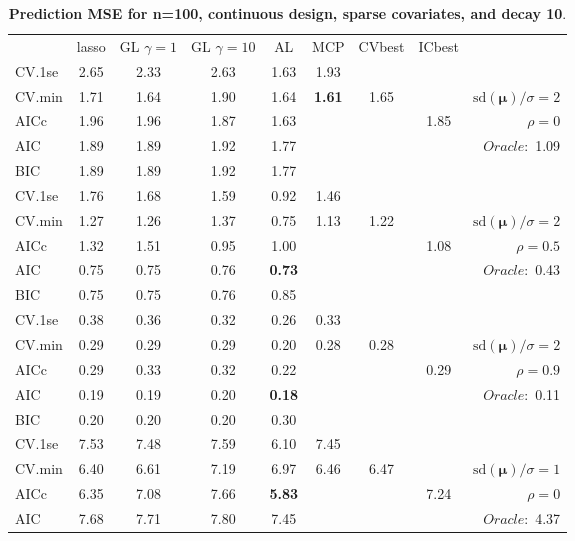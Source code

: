 \clearpage
\begin{table}\vspace{-.5cm}
\caption[l]{ { \bf Prediction MSE for n=100, continuous design, 
sparse covariates, and  decay  10}.}
\vspace{-.5cm}
\footnotesize{}
\begin{center}
\begin{tabular}{l*{7}{c}|r}
 & lasso & GL $\gamma=1$ & GL $\gamma=10$ & AL & MCP  & CVbest & ICbest  \\
\cline{1-9}
CV.1se & 2.65 & 2.33 & 2.63 & 1.63 & 1.93 & & & \\
CV.min & 1.71 & 1.64 & 1.90 & 1.64 & {\bf 1.61} & 1.65 & & $\mathrm{sd}(\mathbf{\mu})/\sigma=2$ \\
AICc & 1.96 & 1.96 & 1.87 & 1.63 & & & 1.85 &  $\rho=0$ \\
AIC & 1.89 & 1.89 & 1.92 & 1.77 & & & &  \multirow{2}{*}{$Oracle: $ 1.09} \\
BIC & 1.89 & 1.89 & 1.92 & 1.77 & & & &  \\
 \hline 
CV.1se & 1.76 & 1.68 & 1.59 & 0.92 & 1.46 & & & \\
CV.min & 1.27 & 1.26 & 1.37 & 0.75 & 1.13 & 1.22 & & $\mathrm{sd}(\mathbf{\mu})/\sigma=2$ \\
AICc & 1.32 & 1.51 & 0.95 & 1.00 & & & 1.08 &  $\rho=0.5$ \\
AIC & 0.75 & 0.75 & 0.76 & {\bf 0.73} & & & &  \multirow{2}{*}{$Oracle: $ 0.43} \\
BIC & 0.75 & 0.75 & 0.76 & 0.85 & & & &  \\
 \hline 
CV.1se & 0.38 & 0.36 & 0.32 & 0.26 & 0.33 & & & \\
CV.min & 0.29 & 0.29 & 0.29 & 0.20 & 0.28 & 0.28 & & $\mathrm{sd}(\mathbf{\mu})/\sigma=2$ \\
AICc & 0.29 & 0.33 & 0.32 & 0.22 & & & 0.29 &  $\rho=0.9$ \\
AIC & 0.19 & 0.19 & 0.20 & {\bf 0.18} & & & &  \multirow{2}{*}{$Oracle: $ 0.11} \\
BIC & 0.20 & 0.20 & 0.20 & 0.30 & & & &  \\
 \hline 
CV.1se & 7.53 & 7.48 & 7.59 & 6.10 & 7.45 & & & \\
CV.min & 6.40 & 6.61 & 7.19 & 6.97 & 6.46 & 6.47 & & $\mathrm{sd}(\mathbf{\mu})/\sigma=1$ \\
AICc & 6.35 & 7.08 & 7.66 & {\bf 5.83} & & & 7.24 &  $\rho=0$ \\
AIC & 7.68 & 7.71 & 7.80 & 7.45 & & & &  \multirow{2}{*}{$Oracle: $ 4.37} \\

\end{tabular}
\end{center}
\end{table}
